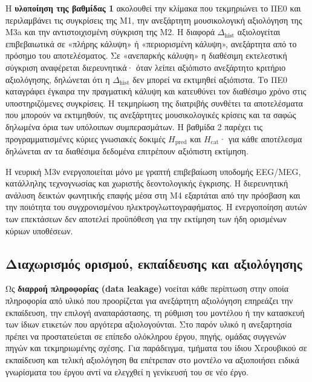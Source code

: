 \documentclass[11pt,a4paper]{article}
\begin{document}
Η \textbf{υλοποίηση της βαθμίδας 1} ακολουθεί την κλίμακα που τεκμηριώνει το ΠΕ0 και περιλαμβάνει τις συγκρίσεις της M1, την ανεξάρτητη μουσικολογική αξιολόγηση της M3a και την αντιστοιχισμένη σύγκριση της M2. Η διαφορά $\Delta_{\mathrm{hist}}$ αξιολογείται επιβεβαιωτικά σε «πλήρης κάλυψη» ή «περιορισμένη κάλυψη», ανεξάρτητα από το πρόσημο του αποτελέσματος. Σε «ανεπαρκής κάλυψη» η διαθέσιμη εκτελεστική σύγκριση αναφέρεται διερευνητικά· όταν λείπει αξιόπιστο ανεξάρτητο κριτήριο αξιολόγησης, δηλώνεται ότι η $\Delta_{\mathrm{hist}}$ δεν μπορεί να εκτιμηθεί αξιόπιστα. Το ΠΕ0 καταγράφει έγκαιρα την πραγματική κάλυψη και κατευθύνει τον διαθέσιμο χρόνο στις υποστηριζόμενες συγκρίσεις. Η τεκμηρίωση της διατριβής συνθέτει τα αποτελέσματα που μπορούν να εκτιμηθούν, τις ανεξάρτητες μουσικολογικές κρίσεις και τα σαφώς δηλωμένα όρια των υπόλοιπων συμπερασμάτων. Η βαθμίδα 2 παρέχει τις προγραμματισμένες κύριες γνωσιακές δοκιμές $H_{\mathrm{pred}}$ και $H_{\mathrm{cat}}$· για κάθε αποτέλεσμα δηλώνεται αν τα διαθέσιμα δεδομένα επιτρέπουν αξιόπιστη εκτίμηση.

Η νευρική M3ν ενεργοποιείται μόνο με γραπτή επιβεβαίωση υποδομής EEG/MEG, κατάλληλης τεχνογνωσίας και χωριστής δεοντολογικής έγκρισης. Η διερευνητική ανάλυση δεικτών φωνητικής επαφής μέσα στη M4 εξαρτάται από την πρόσβαση και την ποιότητα του συγχρονισμένου ηλεκτρογλωττογραφήματος. Η ενεργοποίηση αυτών των επεκτάσεων δεν αποτελεί προϋπόθεση για την εκτίμηση των ήδη ορισμένων κύριων υποθέσεων.



\subsection{Διαχωρισμός ορισμού, εκπαίδευσης και αξιολόγησης}

Ως \textbf{διαρροή πληροφορίας (data leakage)} νοείται κάθε περίπτωση στην οποία πληροφορία από υλικό που προορίζεται για ανεξάρτητη αξιολόγηση επηρεάζει την εκπαίδευση, την επιλογή αναπαράστασης, τη ρύθμιση του μοντέλου ή την κατασκευή των ίδιων ετικετών που αργότερα αξιολογούνται. Στο παρόν υλικό η ανεξαρτησία πρέπει να προστατεύεται σε επίπεδο ολόκληρου έργου, πηγής, ομάδας συγγενών πηγών και τεκμηριωμένης σχέσης. Για παράδειγμα, τμήματα του ίδιου Χερουβικού σε εκπαίδευση και τελική αξιολόγηση θα επέτρεπαν στο μοντέλο να αξιοποιήσει ειδικά γνωρίσματα του έργου αντί να ελεγχθεί η γενίκευσή του σε νέο έργο.
\end{document}
